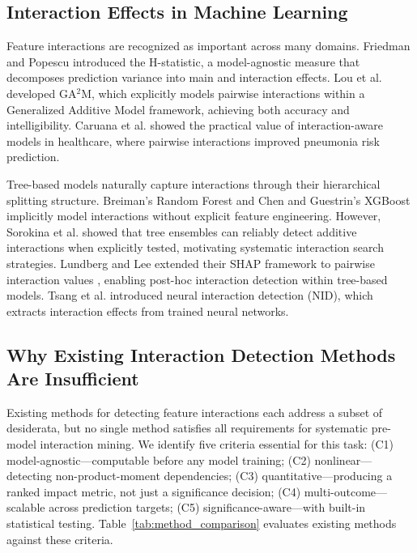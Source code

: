 \documentclass[conference]{IEEEtran}
\begin{document}
\subsection{Interaction Effects in Machine Learning}

Feature interactions are recognized as important across many domains. Friedman and Popescu \cite{friedman2008predictive} introduced the H-statistic, a model-agnostic measure that decomposes prediction variance into main and interaction effects. Lou et al. \cite{lou2013accurate} developed GA$^2$M, which explicitly models pairwise interactions within a Generalized Additive Model framework, achieving both accuracy and intelligibility. Caruana et al. \cite{caruana2015intelligible} showed the practical value of interaction-aware models in healthcare, where pairwise interactions improved pneumonia risk prediction.

Tree-based models naturally capture interactions through their hierarchical splitting structure. Breiman's Random Forest \cite{breiman2001random} and Chen and Guestrin's XGBoost \cite{chen2016xgboost} implicitly model interactions without explicit feature engineering. However, Sorokina et al. \cite{sorokina2008detecting} showed that tree ensembles can reliably detect additive interactions when explicitly tested, motivating systematic interaction search strategies. Lundberg and Lee \cite{lundberg2017unified} extended their SHAP framework to pairwise interaction values \cite{lundberg2020shap}, enabling post-hoc interaction detection within tree-based models. Tsang et al. \cite{tsang2018detecting} introduced neural interaction detection (NID), which extracts interaction effects from trained neural networks.

\subsection{Why Existing Interaction Detection Methods Are Insufficient}

Existing methods for detecting feature interactions each address a subset of desiderata, but no single method satisfies all requirements for systematic pre-model interaction mining. We identify five criteria essential for this task: (C1) model-agnostic---computable before any model training; (C2) nonlinear---detecting non-product-moment dependencies; (C3) quantitative---producing a ranked impact metric, not just a significance decision; (C4) multi-outcome---scalable across prediction targets; (C5) significance-aware---with built-in statistical testing. Table~\ref{tab:method_comparison} evaluates existing methods against these criteria.
\end{document}
